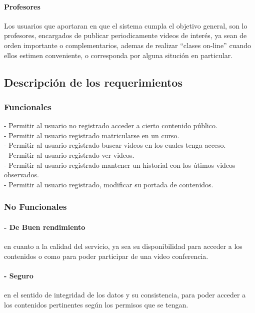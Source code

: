 \documentclass[12pt]{article}
\begin{document}
\paragraph{Profesores\\}

Los usuarios que aportaran en que el sistema cumpla el objetivo general, son lo profesores, 
encargados de publicar periodicamente videos de interés, ya sean de orden importante o complementarios, 
ademas de realizar ``clases on-line'' cuando ellos estimen conveniente, o corresponda por alguna situción
en particular.
\subsection{Descripción de los requerimientos}
\subsubsection{Funcionales}

- Permitir al usuario no registrado acceder a cierto contenido público.\\

- Permitir al usuario registrado matricularse en un curso.\\

- Permitir al usuario registrado buscar videos en los cuales tenga acceso.\\

- Permitir al usuario registrado ver videos.\\

- Permitir al usuario registrado mantener un historial con los útimos videos observados.\\ 

- Permitir al usuario registrado, modificar su portada de contenidos.\\

\subsubsection{No Funcionales}

\paragraph{- De Buen rendimiento} en cuanto a la calidad del servicio, ya sea su disponibilidad para acceder a los 
contenidos o como para poder participar de una video conferencia.\\

\paragraph{- Seguro} en el sentido de integridad de los datos y su consistencia, para poder acceder a los contenidos
pertinentes según los permisos que se tengan.\\
\end{document}
